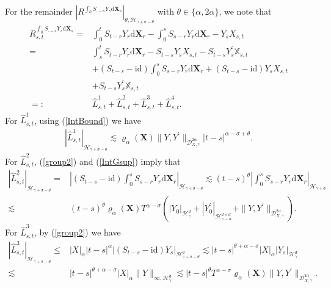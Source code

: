 \documentclass[10pt,a4paper]{article}
\numberwithin{equation}{section}
\begin{document}
For the remainder $\left|R^{\int_0^\cdot S_{\cdot-s} Y_s \mathrm{d} \mathbf X_s} \right|_{\theta,\mathcal H_{\gamma+\sigma-\theta}}$ with $\theta \in \{\alpha,2\alpha \}$, we note that
\begin{align*}
	R_{s,t}^{\int_0^\cdot S_{\cdot-s} Y_s \mathrm{d} \mathbf X_s}
	=& \int_0^t S_{t-r} Y_r \mathrm{d} \mathbf X_r-\int_0^s S_{s-r} Y_r \mathrm{d} \mathbf X_r-Y_s X_{s,t} \nonumber\\
	=& \int_s^t S_{t-r} Y_r \mathrm{d} \mathbf X_r -S_{t-s} Y_s X_{s,t} -S_{t-s} Y_s^\prime \mathbb{X}_{s,t} \nonumber\\
	&+ (S_{t-s}-\mathrm{id} ) \int_0^s S_{s-r} Y_r \mathrm{d} \mathbf X_r
	+(S_{t-s}-\mathrm{id} ) Y_s X_{s,t} \nonumber\\
	&+S_{t-s} Y_s^\prime \mathbb{X}_{s,t} \nonumber\\
	=:& \hat{L}_{s,t}^1+\hat{L}_{s,t}^2+\hat{L}_{s,t}^3+\hat{L}_{s,t}^4.
\end{align*}
For $\hat{L}_{s,t}^1$, using (\ref{IntBound}) we have
\begin{align}\label{I1}
	|\hat{L}_{s,t}^1|_{\mathcal H_{\gamma+\sigma-\theta}} \lesssim  \varrho_{\alpha}(\mathbf{X}) \|Y,Y^\prime\|_{\mathcal{D}_{X,\gamma}^{2\alpha}} |t-s|^{\alpha-\sigma+\theta}.
\end{align}	
For $\hat{L}_{s,t}^2$, (\ref{group2}) and (\ref{IntGsup}) imply that
\begin{align}\label{I2}
|\hat{L}_{s,t}^2|_{\mathcal H_{\gamma+\sigma-\theta}}=& \left| (S_{t-s}-\mathrm{id} ) \int_0^s S_{s-r} Y_r \mathrm{d} \mathbf X_r\right|_{\mathcal H_{\gamma+\sigma-\theta}}
 \lesssim  (t-s)^\theta \left|\int_0^s S_{s-r} Y_r \mathrm{d} \mathbf X_r \right|_{\mathcal{H}_{\gamma+\sigma}} \nonumber\\
	\lesssim & (t-s)^\theta \varrho_{\alpha}(\mathbf{X}) T^{\alpha-\sigma}\left(|Y_0|_{\mathcal H_\gamma^d}+|Y_0^\prime|_{\mathcal H_{\gamma-\alpha}^{d \times d}}+\|Y,Y^\prime\|_{\mathcal{D}_{X,\gamma}^{2\alpha}} \right).
\end{align}
For $\hat{L}_{s,t}^3$, by (\ref{group2}) we have
\begin{align}\label{I3}
	|\hat{L}_{s,t}^3|_{\mathcal H_{\gamma+\sigma-\theta}} \leq & |X|_\alpha |t-s|^\alpha |(S_{t-s}-\mathrm{id} ) Y_s|_{\mathcal H_{\gamma+\sigma-\theta}^{d}  }
	\lesssim |t-s|^{\theta+\alpha-\sigma} |X|_\alpha |Y_s|_{\mathcal H_{\gamma}^{d}} \nonumber\\
	\lesssim & |t-s|^{\theta+\alpha-\sigma} |X|_\alpha \|Y\|_{\infty,\mathcal H_{\gamma}^{d}}
	\lesssim    |t-s|^\theta  T^{\alpha-\sigma} \varrho_{\alpha}(\mathbf{X})  \|Y,Y^\prime\|_{\mathcal{D}_{X,\gamma}^{2\alpha}} .
\end{align}
\end{document}
